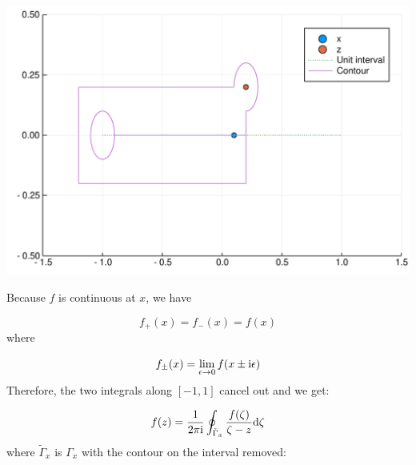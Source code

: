 \documentclass[12pt,a4paper]{article}
\def\D{ {\rm d} }
\def\I{ {\rm i} }
\begin{document}
\includegraphics[width=\linewidth]{figures/Lecture10_9_1.pdf}

Because $f$ is continuous at $x$, we have

\[
f_+(x) = f_-(x) = f(x)
\]
where

\[
f_\pm(x) = \lim_{\epsilon \rightarrow 0} f(x \pm \I \epsilon)
\]
Therefore, the two integrals along $[-1,1]$ cancel out and we get:

\[
    f(z) = {1 \over 2 \pi \I} \oint_{{\tilde \Gamma}_x} {f(\zeta) \over \zeta - z} \D \zeta
\]
where ${\tilde \Gamma}_x$ is $\Gamma_x$ with the contour on the interval removed:
\end{document}
